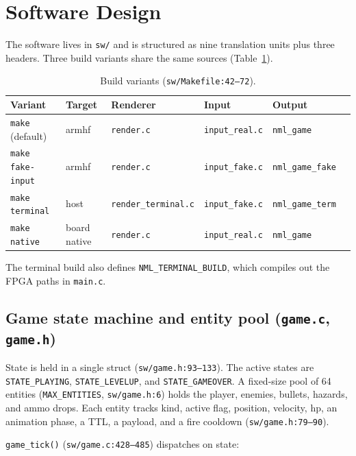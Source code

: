 \documentclass[11pt,letterpaper]{article}
\begin{document}
\section{Software Design}

The software lives in \texttt{sw/} and is structured as nine translation
units plus three headers. Three build variants share the same sources
(Table~\ref{tab:builds}).

\begin{table}[h]
\centering
\begin{tabular}{llllll}
\toprule
Variant & Target & Renderer & Input & Output \\
\midrule
\texttt{make} (default) & armhf & \texttt{render.c} & \texttt{input\_real.c} & \texttt{nml\_game} \\
\texttt{make fake-input} & armhf & \texttt{render.c} & \texttt{input\_fake.c} & \texttt{nml\_game\_fake} \\
\texttt{make terminal} & host & \texttt{render\_terminal.c} & \texttt{input\_fake.c} & \texttt{nml\_game\_term} \\
\texttt{make native} & board native & \texttt{render.c} & \texttt{input\_real.c} & \texttt{nml\_game} \\
\bottomrule
\end{tabular}
\caption{Build variants (\texttt{sw/Makefile:42--72}).}
\label{tab:builds}
\end{table}

The terminal build also defines \texttt{NML\_TERMINAL\_BUILD}, which compiles
out the FPGA paths in \texttt{main.c}.

\subsection{Game state machine and entity pool (\texttt{game.c}, \texttt{game.h})}

State is held in a single struct (\texttt{sw/game.h:93--133}). The active
states are \texttt{STATE\_PLAYING}, \texttt{STATE\_LEVELUP}, and
\texttt{STATE\_GAMEOVER}. A fixed-size pool of 64 entities
(\texttt{MAX\_ENTITIES}, \texttt{sw/game.h:6}) holds the player, enemies,
bullets, hazards, and ammo drops. Each entity tracks kind, active flag,
position, velocity, hp, an animation phase, a TTL, a payload, and a fire
cooldown (\texttt{sw/game.h:79--90}).

\texttt{game\_tick()} (\texttt{sw/game.c:428--485}) dispatches on state:
\end{document}
